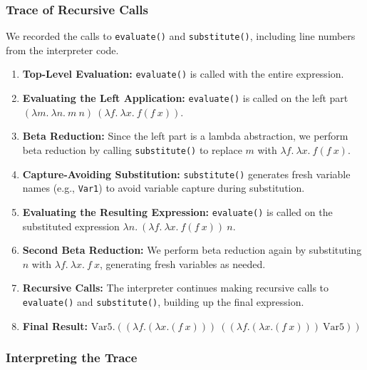 \documentclass{article}
\begin{document}
\subsubsection*{Trace of Recursive Calls}

We recorded the calls to \texttt{evaluate()} and \texttt{substitute()}, including line numbers from the interpreter code.

\begin{enumerate}
    \item \textbf{Top-Level Evaluation:} \texttt{evaluate()} is called with the entire expression.

    \item \textbf{Evaluating the Left Application:} \texttt{evaluate()} is called on the left part \((\lambda m.\ \lambda n.\ m\ n)\ (\lambda f.\ \lambda x.\ f(f\ x))\).

    \item \textbf{Beta Reduction:} Since the left part is a lambda abstraction, we perform beta reduction by calling \texttt{substitute()} to replace \(m\) with \(\lambda f.\ \lambda x.\ f(f\ x)\).

    \item \textbf{Capture-Avoiding Substitution:} \texttt{substitute()} generates fresh variable names (e.g., \texttt{Var1}) to avoid variable capture during substitution.

    \item \textbf{Evaluating the Resulting Expression:} \texttt{evaluate()} is called on the substituted expression \(\lambda n.\ (\lambda f.\ \lambda x.\ f(f\ x))\ n\).

    \item \textbf{Second Beta Reduction:} We perform beta reduction again by substituting \(n\) with \(\lambda f.\ \lambda x.\ f\ x\), generating fresh variables as needed.

    \item \textbf{Recursive Calls:} The interpreter continues making recursive calls to \texttt{evaluate()} and \texttt{substitute()}, building up the final expression.

    \item \textbf{Final Result:} \(\text{Var5}.((\lambda f.(\lambda x.(f\ x)))\ ((\lambda f.(\lambda x.(f\ x)))\ \text{Var5}))\)


\end{enumerate}

\subsubsection*{Interpreting the Trace}
\end{document}
